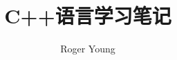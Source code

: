 \documentclass{ctexbook}
\newcommand{\documentTitle}
    {\texorpdfstring{C++语言学习笔记}{C++语言学习笔记}}
\newcommand{\documentAuthor}{Roger Young}
\begin{document}
\title{\documentTitle}
\author{\documentAuthor}

\maketitle
\tableofcontents













\printindex
\printglossaries
\end{document}
